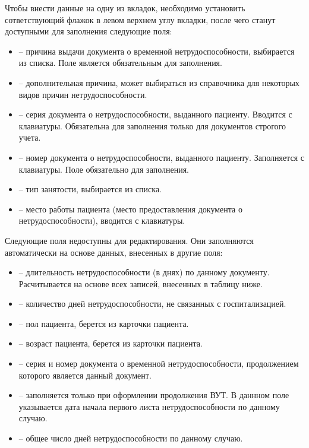 Чтобы внести данные на одну из вкладок, необходимо установить сответствующий флажок в левом верхнем углу вкладки, после чего станут доступными для заполнения следующие поля:
\begin{itemize}
 \item {} -- причина выдачи документа о временной нетрудоспособности, выбирается из списка. Поле является обязательным для заполнения.
 \item {} -- дополнительная причина, может выбираться из справочника для некоторых видов причин нетрудоспособности. 
 \item {} -- серия документа о  нетрудоспособности, выданного пациенту. Вводится с клавиатуры. Обязательна для заполнения только для документов строгого учета.
 \item {} -- номер документа о нетрудоспособности, выданного пациенту. Заполняется с клавиатуры. Поле обязательно для заполнения.
 \item {} -- тип занятости, выбирается из списка.
 \item {} -- место работы пациента (место предоставления документа о нетрудоспособности), вводится с клавиатуры.
\end{itemize}

Следующие поля недоступны для редактирования. Они заполняются автоматически на основе данных, внесенных в другие поля:
\begin{itemize}
 \item {} -- длительность нетрудоспособности (в днях) по данному документу. Расчитывается на основе всех записей, внесенных в таблицу ниже.
 \item {} -- количество дней нетрудоспособности, не связанных с госпитализацией.
 \item {} -- пол пациента, берется из карточки пациента.
 \item {} -- возраст пациента, берется из карточки пациента.
 \item {} -- серия и номер документа о временной нетрудоспособности, продолжением которого является данный документ.
 \item {} -- заполняется только при оформлении продолжения ВУТ. В даннном поле указывается дата начала первого листа нетрудоспособности по данному случаю.
 \item {} -- общее число дней нетрудоспособности по данному случаю. 
\end{itemize}

